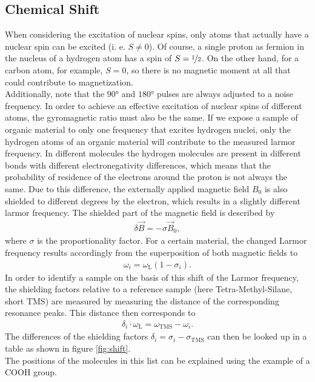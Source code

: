 \subsection{Chemical Shift}
When considering the excitation of nuclear spins, only atoms that actually have a nuclear spin can be excited (i. e. $S\neq 0$).
Of course, a single proton as fermion in the nucleus of a hydrogen atom has a spin of $S = \nicefrac{1}{2}$.
On the other hand, for a carbon atom, for example, $S = 0$, so there is no magnetic moment at all that could contribute to magnetization.\\
Additionally, note that the $\ang{90}$ and $\ang{180}$ pulses are always adjusted to a noise frequency.
In order to achieve an effective excitation of nuclear spins of different atoms, the gyromagnetic ratio must also be the same.
If we expose a sample of organic material to only one frequency that excites hydrogen nuclei, only the hydrogen atoms of an organic material will contribute to the measured larmor frequency.
In different molecules the hydrogen molecules are present in different bonds with different electronegativity differences, which means that the probability of residence of the electrons around the proton is not always the same.
Due to this difference, the externally applied magnetic field $B_0$ is also shielded to different degrees by the electron, which results in a slightly different larmor frequency.
The shielded part of the magnetic field is described by
\begin{align}
\delta\vec{B}=-\sigma\vec{B}_0,
\end{align}
where $\sigma$ is the proportionality factor.
For a certain material, the changed Larmor frequency results accordingly from the superposition of both magnetic fields to
\begin{align}
\omega_i=\omega_\text{L}(1-\sigma_i).
\end{align}
In order to identify a sample on the basis of this shift of the Larmor frequency, the shielding factors relative to a reference sample (here Tetra-Methyl-Silane, short TMS) are measured by measuring the distance of the corresponding resonance peaks.
This distance then corresponds to
\begin{align}
\delta_i\cdot\omega_\text{L}=\omega_\text{TMS}-\omega_i.
\end{align}
The differences of the shielding factors $\delta_i =\sigma_i-\sigma_\text{TMS}$ can then be looked up in a table as shown in figure \ref{fig:shift}.\\
The positions of the molecules in this list can be explained using the example of a COOH group.
